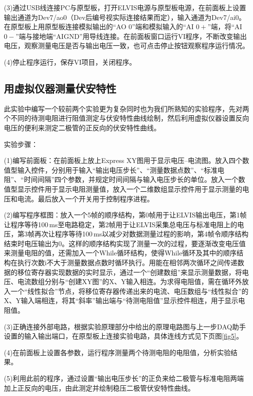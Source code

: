 \documentclass[UTF8]{article}
\theoremstyle{MyLineTheoremStyle} %
\theoremstyle{MyBlockTheoremStyle} %
\theoremstyle{MySubsubsectionStyle} %
\begin{document}
(3)通过USB线连接PC与原型板，打开ELVIS电源与原型板电源，在前面板上设置输出通道为Dev7/ao0（Dev后编号视实际连接结果而定），输入通道为Dev7/ai0。在原型板上用原型板连接模拟输出的“AO 0”端和模拟输入的“AI $ 0+ $”端，将“AI $ 0- $”端与接地端“AIGND”用导线连接。在前面板窗口运行VI程序，不断改变输出电压，观察测量电压是否与输出电压一致，也可点击停止按钮观察程序运行情况。

(4)停止程序运行，保存VI项目，关闭程序。

\subsection{用虚拟仪器测量伏安特性}
此实验中编写一个较前两个实验更为复杂同时也为我们所熟知的实验程序，先对两个不同的待测电阻进行阻值测定与伏安特性曲线绘制，然后利用虚拟仪器设置反向电压的便利来测定二极管的正反向的伏安特性曲线。

实验步骤：

(1)编写前面板：在前面板上放上Express XY图用于显示电压--电流图。放入四个数值型输入控件，分别用于输入“输出电压步长”、“测量数据点数”、“标准电阻”、“时间间隔”四个参数，并规定时间间隔与输入电压步长的单位。放入一个数值型显示控件用于显示电阻测量值，放入一个二维数组显示控件用于显示测量的电压和电流。最后放入一个开关用于控制程序进程。

(2)编写程序框图：放入一个5帧的顺序结构，第0帧用于让ELVIS输出电压，第1帧让程序等待100\,ms至电路稳定，第2帧用于让ELVIS采集总电压与标准电阻上的电压，第3帧再次让程序等待100\,ms以减少对数据测量过程的影响，第4帧令顺序结构结束时电压输出为0。这样的顺序结构实现了测量一次的过程，要逐渐改变电压值来测量电阻的值，还需加入一个While循环结构，使得While循环及其中的顺序结构在执行次数i不大于测量数据点数时循环执行。用能在相邻两次循环之间传递数据的移位寄存器实现数据的实时显示，通过一个“创建数组”来显示测量数据，将电压、电流数组分别与“创建XY图”的X、Y输入相连。为求得电阻值，需在循环外放入一个“线性拟合”节点，将移位寄存器传递出来的电流、电压数组与“线性拟合”的X、Y输入端相连，将其“斜率”输出端与“待测电阻值”显示控件相连，用于显示电阻值。

(3)正确连接外部电路，根据实验原理部分中给出的原理电路图与上一步DAQ助手设置的输入输出端口，在原型板上连接实验电路，具体连线方式见下页图\ref{fig5}。

(4)在前面板上设置各参数，运行程序测量两个待测电阻的电阻值，分析实验结果。

(5)利用此前的程序，通过设置“输出电压步长”的正负来给二极管与标准电阻两端加上正反向的电压，由此测定并绘制稳压二极管伏安特性曲线。

\end{document}
